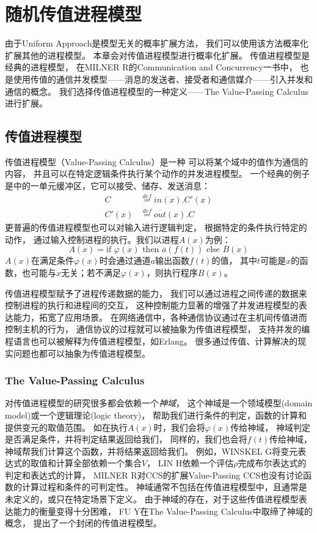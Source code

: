 
\chapter{随机传值进程模型}\label{ch:rvpc}

由于Uniform Approach是模型无关的概率扩展方法，
我们可以使用该方法概率化扩展其他的进程模型。
本章会对传值进程模型进行概率化扩展。
传值进程模型是经典的进程模型，
在MILNER R的Communication and Concurrency一书\cite{Milner_CCS}中，
也是使用传值的通信并发模型——消息的发送者、接受者和通信媒介——引入并发和通信的概念。
我们选择传值进程模型的一种定义——The Value-Passing Calculus\cite{Fu_VPC}进行扩展。

\section{传值进程模型}
传值进程模型（Value-Passing Calculus）是一种
可以将某个域中的值作为通信的内容，
并且可以在特定逻辑条件执行某个动作的并发进程模型。
一个经典的例子是\cite{Milner_CCS}中的一单元缓冲区，它可以接受、储存、发送消息：
\begin{align*}
   C&\stackrel{def}{=}in(x).C'(x)\\
   C'(x)&\stackrel{def}{=}\overline{out}(x).C
\end{align*}
更普遍的传值进程模型也可以对输入进行逻辑判定，
根据特定的条件执行特定的动作，
通过输入控制进程的执行。我们以进程$A(x)$为例：
$$A(x)=\textrm{if }\varphi(x)\textrm{ then }\overline{a}(f(t))\textrm{ else }B(x)$$
$A(x)$在满足条件$\varphi(x)$时会通过通道$a$输出函数$f(t)$的值，
其中$t$可能是$x$的函数，也可能与$x$无关；若不满足$\varphi(x)$，则执行程序$B(x)$。

传值进程模型赋予了进程传递数据的能力，
我们可以通过进程之间传递的数据来控制进程的执行和进程间的交互，
这种控制能力显著的增强了并发进程模型的表达能力，拓宽了应用场景。
在网络通信中，各种通信协议通过在主机间传值进而控制主机的行为，
通信协议的过程就可以被抽象为传值进程模型，
支持并发的编程语言也可以被解释为传值进程模型，如Erlang\cite{Erlang}。
很多通过传值、计算解决的现实问题也都可以抽象为传值进程模型。


\subsection{The Value-Passing Calculus}\label{ch:vpc}
对传值进程模型的研究很多都会依赖一个\textit{神域}，
这个神域是一个领域模型(domain model)或一个逻辑理论(logic theory)，
帮助我们进行条件的判定，函数的计算和提供变元的取值范围。
如在执行$A(x)$时，我们会将$\varphi(x)$传给神域，
神域判定是否满足条件，并将判定结果返回给我们，
同样的，我们也会将$f(t)$传给神域，神域帮我们计算这个函数，并将结果返回给我们。
例如，WINSKEL G将变元表达式的取值和计算全部依赖一个集合$V$\cite{Oracle_V}，
LIN H依赖一个评估$\rho$完成布尔表达式的判定和表达式的计算\cite{Oracle_rho}，
MILNER R对CCS的扩展Value-Passing CCS也没有讨论函数的计算过程和条件的可判定性\cite{Milner_CCS}。
神域通常不包括在传值进程模型中，且通常是未定义的，或只在特定场景下定义。
由于神域的存在，对于这些传值进程模型表达能力的衡量变得十分困难，
FU Y在The Value-Passing Calculus中取缔了神域的概念，
提出了一个封闭的传值进程模型\cite{Fu_VPC}。

